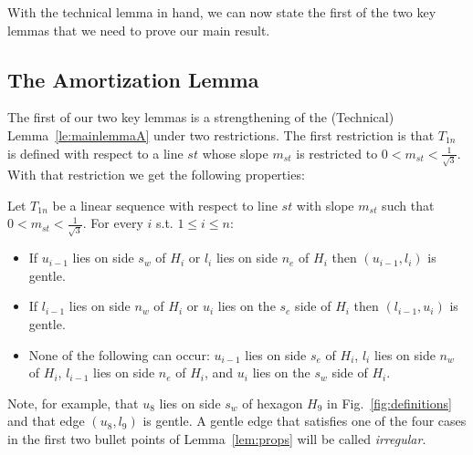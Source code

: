 
With the technical lemma in hand, we can now state the first of the two
key lemmas that we need to prove our main result.





\subsection{The Amortization Lemma}

The first of our two key lemmas is a strengthening of the (Technical) Lemma~\ref{le:mainlemmaA}
under two restrictions. The first restriction is that $T_{1n}$ is %
defined with respect to a line $st$ whose slope $m_{st}$ is restricted to
$0 < m_{st} < \frac{1}{\sqrt{3}}$. With that restriction we get the following
properties:


\begin{lemma}
\label{lem:props}
Let $T_{1n}$ be a linear sequence with respect to line $st$ with slope $m_{st}$
such that $0 < m_{st} < \frac{1}{\sqrt{3}}$. For every $i$ s.t. 
$1 \leq i \leq n$:
\begin{itemize}
\item If $u_{i-1}$ lies on side $s_w$ of $H_{i}$ or $l_{i}$ lies on 
side $n_e$ of $H_{i}$ then $(u_{i-1},l_{i})$ is gentle.
\item If $l_{i-1}$ lies on side $n_w$ of $H_{i}$ or $u_{i}$ lies on the $s_e$
side of $H_{i}$ then $(l_{i-1},u_{i})$ is gentle.
\item None of the following can occur: $u_{i-1}$ lies on side $s_e$ of $H_{i}$,
$l_{i}$ lies on side $n_w$ of $H_{i}$, $l_{i-1}$ lies on side $n_e$ of $H_{i}$,
and $u_{i}$ lies on the $s_w$ side of $H_{i}$. 
\end{itemize}
\end{lemma}
\noindent Note, for example, that $u_8$ lies on side $s_w$ of hexagon
$H_9$ in Fig.~\ref{fig:definitions} and that edge $(u_8,l_9)$ is gentle. 
A gentle edge that satisfies one of the four cases in the first two bullet points of
Lemma~\ref{lem:props} will
be called {\em irregular}. 


